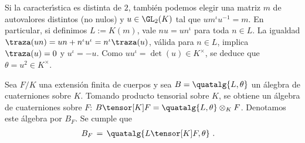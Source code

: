 \begin{ejemploMatrices}
	Si la caracter\'{\i}stica es distinta de $2$, tambi\'{e}n podemos
	elegir una matriz $m$ de autovalores distintos (no nulos) y
	$u\in\GL_{2}(K)$ tal que $um^\iota u^{-1}=m$. En particular, si
	definimos $L:=K(m)$, vale $nu=un^\iota$ para toda $n\in L$. La igualdad
	$\traza(un)=un+n^\iota u^\iota=n^\iota\traza(u)$, v\'{a}lida para
	$n\in L$, implica $\traza(u)=0$ y $u^\iota =-u$. Como
	$uu^\iota=\det(u)\in K^{\times}$, se deduce que
	$\theta=u^2\in K^{\times}$.
\end{ejemploMatrices}

Sea $F/K$ una extensi\'{o}n finita de cuerpos y sea $B=\quatalg{L,\theta}$ un
\'{a}legbra de cuaterniones sobre $K$. Tomando producto tensorial sobre $K$, se
obtiene un \'{a}lgebra de cuaterniones sobre $F$:
$B\tensor[K]F=\quatalg{L,\theta}\otimes_{K}F$. Denotamos este \'{a}lgebra por
$B_{F}$. Se cumple que
\begin{align*}
	B_{F} & \,=\,\quatalg{L\tensor[K] F,\theta}
	\text{ .}
\end{align*}
%

